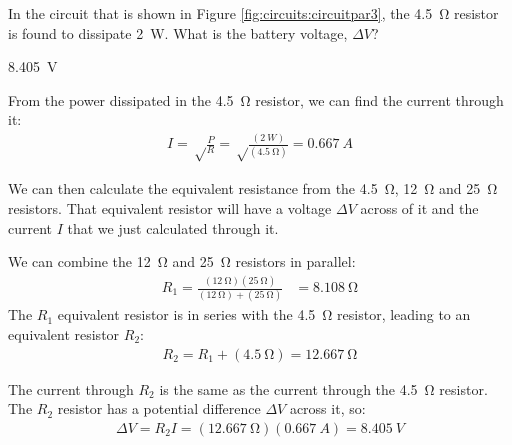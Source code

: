 \question In the circuit that is shown in Figure \ref{fig:circuits:circuitpar3}, the \SI{4.5}{\ohm} resistor is found to dissipate \SI{2}{W}. What is the battery voltage, $\Delta V$?
\begin{finalanswer}
\SI{8.405}{V}
\end{finalanswer}
\begin{solution}
From the power dissipated in the \SI{4.5}{\ohm} resistor, we can find the current through it:
\begin{align*}
I=\sqrt\frac{P}{R}=\sqrt\frac{(\SI{2}{W})}{(\SI{4.5}{\ohm})}=\SI{0.667}{A}
\end{align*}

We can then calculate the equivalent resistance from the \SI{4.5}{\ohm}, \SI{12}{\ohm} and \SI{25}{\ohm} resistors. That equivalent resistor will have a voltage $\Delta V$ across of it and the current $I$ that we just calculated through it. 

We can combine the \SI{12}{\ohm} and \SI{25}{\ohm} resistors in parallel:
\begin{align*}
R_1=\frac{(\SI{12}{\ohm})(\SI{25}{\ohm})}{(\SI{12}{\ohm})+(\SI{25}{\ohm})}&=\SI{8.108}{\ohm}
\end{align*}
The $R_1$ equivalent resistor is in series with the \SI{4.5}{\ohm} resistor, leading to an equivalent resistor $R_2$:
\begin{align*}
R_2=R_1+(\SI{4.5}{\ohm})=\SI{12.667}{\ohm}
\end{align*}

The current through $R_2$ is the same as the current through the \SI{4.5}{\ohm} resistor. The $R_2$ resistor has a potential difference $\Delta V$ across it, so:
\begin{align*}
\Delta V=R_2I=(\SI{12.667}{\ohm})(\SI{0.667}{A})=\SI{8.405}{V}
\end{align*} 

\end{solution}

